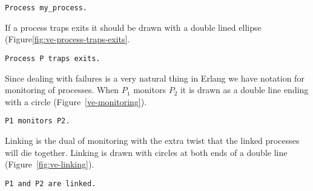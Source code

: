 \documentclass[a4paper, pdftex]{tufte-handout}
\begin{document}
\begin{marginfigure}
  \begin{center}

    \caption{\texttt{Process my\_process.}}
    \label{fig:ve-process}
  \end{center}
\end{marginfigure}





If a process traps exits it should be drawn with a double lined ellipse
(Figure\ref{fig:ve-process-traps-exits}. 

\begin{marginfigure}
  \begin{center}
    \caption{\texttt{Process P traps exits.}}
    \label{fig:ve-process-traps-exits}
  \end{center}
\end{marginfigure}


Since dealing with failures is a very natural thing in Erlang we have notation for
monitoring of processes. When $P_1$ monitors $P_2$ it is drawn as a double line
ending with a circle (Figure~\ref{ve-monitoring}).

\begin{marginfigure}
  \centering
  
  \caption{\texttt{P1 monitors P2.}}
  \label{fig:ve-monitoring}
\end{marginfigure}


Linking is the dual of monitoring with the extra twist that the linked processes will
die together. Linking is drawn with circles at both ends of a double line
(Figure~\ref{fig:ve-linking}). 


\begin{marginfigure}
  \centering
  \caption{\texttt{P1 and P2 are linked.}}
  \label{fig:ve-linking}
\end{marginfigure}
\end{document}
